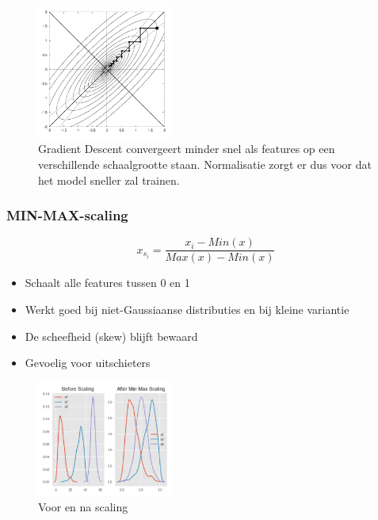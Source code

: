 \documentclass{article}
\begin{document}
\begin{figure}[H]
    \centering
    \includegraphics[width=0.4\textwidth]{scaling.png}
    \caption{Gradient Descent convergeert minder snel als features op een verschillende schaalgrootte staan. Normalisatie zorgt er dus voor dat het model sneller zal trainen.}
\end{figure}

\subsubsection{MIN-MAX-scaling}

\begin{equation}
x_{s_i} = \frac{x_i - Min(x)}{Max(x) - Min(x)}
\end{equation}

\begin{itemize}
    \item Schaalt alle features tussen 0 en 1
    \item Werkt goed bij niet-Gaussiaanse distributies en bij kleine variantie
    \item De scheefheid (skew) blijft bewaard
    \item Gevoelig voor uitschieters
\end{itemize}

\begin{figure}[H]
    \centering
    \includegraphics[width=0.4\textwidth]{min-max-scaling.png}
    \caption{Voor en na scaling}
\end{figure}
\end{document}
